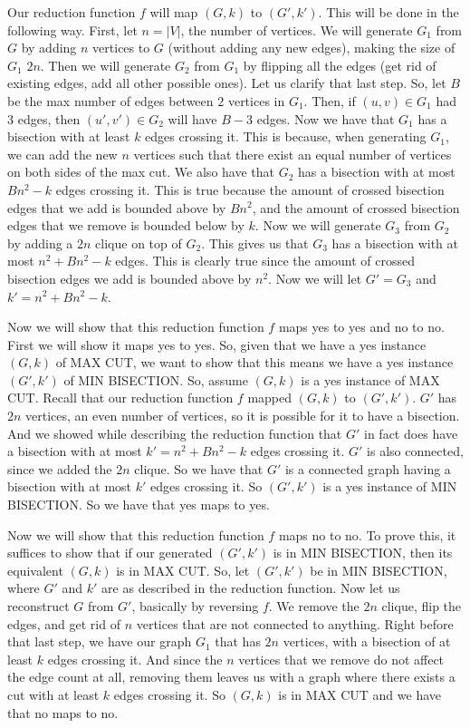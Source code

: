 \documentclass{article}
\begin{document}
Our reduction function $f$ will map $(G,k)$ to $(G', k')$. This will be done
in the following way. First, let $n = |V|$, the number of vertices.
We will generate $G_1$ from $G$ by adding $n$ vertices to $G$ (without
adding any new edges), making the size of $G_1$ $2n$. Then we will generate
$G_2$ from $G_1$ by flipping all the edges (get rid of existing edges, add
all other possible ones). Let us clarify that last step. So,
let $B$ be the max number of edges between $2$ vertices in $G_1$. Then,
if $(u,v) \in G_1$ had $3$ edges, then $(u',v') \in G_2$ will have $B-3$ edges.
Now we have that $G_1$ has a bisection with at least $k$ edges
crossing it. This is because, when generating $G_1$, we can add the new $n$
vertices such that there exist an equal number of vertices on both sides of the
max cut.
We also have that $G_2$ has a bisection with at most $Bn^2 - k$ edges
crossing it. This is true because the amount of crossed bisection edges that we add is
bounded above by $Bn^2$, and the amount of crossed bisection edges that we remove is
bounded below by $k$.
Now we will generate $G_3$ from $G_2$ by adding a $2n$ clique
on top of $G_2$. This gives us that $G_3$ has a bisection with at most
$n^2 + Bn^2 - k$ edges. This is clearly true since the amount of crossed
bisection edges we add is bounded above by $n^2$.
Now we will let $G' = G_3$ and $k' = n^2 + Bn^2 - k$.

Now we will show that this reduction function $f$ maps yes to yes and no to no.
First we will show it maps yes to yes. So, given that we have a yes instance
$(G,k)$ of MAX CUT, we want to show that this means we have a yes instance
$(G',k')$ of MIN BISECTION. So, assume $(G,k)$ is a yes instance of MAX CUT.
Recall that our reduction function $f$ mapped $(G,k)$ to $(G', k')$. $G'$ has
$2n$ vertices, an even number of vertices, so it is possible for it to have
a bisection. And we showed while describing the reduction function that $G'$
in fact does have a bisection with at most $k' = n^2 + Bn^2 - k$ edges crossing it.
$G'$ is also connected, since we added the $2n$ clique. So we have that
$G'$ is a connected graph having a bisection with at most $k'$ edges crossing
it. So $(G',k')$ is a yes instance of MIN BISECTION. So we have that yes maps to
yes.

Now we will show that this reduction function $f$ maps no to no. To prove this,
it suffices to show that if our generated $(G',k')$ is in MIN BISECTION, then
its equivalent $(G,k)$ is in MAX CUT. So, let $(G',k')$ be in MIN BISECTION,
where $G'$ and $k'$ are as described in the reduction function.
Now let us reconstruct $G$ from $G'$, basically by reversing $f$. We
remove the $2n$ clique, flip the edges, and get rid of $n$ vertices that are not
connected to anything. Right before that last step, we
have our graph $G_1$ that has $2n$ vertices, with a bisection of at least $k$
edges crossing it. And since the $n$ vertices that we remove do not affect the
edge count at all, removing them leaves us with a graph where there exists a cut
with at least $k$ edges crossing it. So $(G,k)$ is in MAX CUT and we have that
no maps to no.
\end{document}
